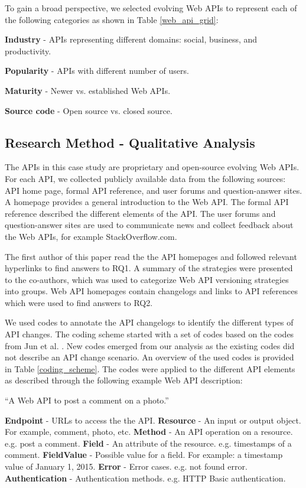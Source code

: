 \documentclass[conference]{IEEEtran}
\begin{document}
To gain a broad perspective, we selected evolving Web APIs to represent each of the following categories as shown in Table \ref{web_api_grid}:


\textbf{Industry} - APIs representing different domains: social, business, and productivity.

\textbf{Popularity} - APIs with different number of users.

\textbf{Maturity} - Newer vs. established Web APIs.

\textbf{Source code} - Open source vs. closed source.


\subsection{Research Method - Qualitative Analysis} %
\label{sub:research_method}

The APIs in this case study are proprietary and open-source evolving Web APIs. For each API, we collected publicly available data from the following sources: API home page, formal API reference, and user forums and question-answer sites. A homepage provides a general introduction to the Web API. The formal API reference described the different elements of the API. The user forums and question-answer sites are used to communicate news and collect feedback about the Web APIs, for example StackOverflow.com.

The first author of this paper read the the API homepages and followed relevant hyperlinks to find answers to RQ1. A summary of the strategies were presented to the co-authors, which was used to categorize Web API versioning strategies into groups. Web API homepages contain changelogs and links to API references which were used to find answers to RQ2.

We used codes to annotate the API changelogs to identify the different types of API changes. The coding scheme started with a set of codes based on the codes from Jun et al. \cite{li_client_2013}. New codes  emerged from our analysis as the existing codes did not describe an API change scenario. An overview of the used codes is provided in Table \ref{coding_scheme}. The codes were applied to the different API elements as described through the following example Web API description:

``A Web API to post a comment on a photo.''

\textbf{Endpoint} - URLs to access the the API.
\textbf{Resource} - An input or output object. For example, comment, photo, etc.
\textbf{Method} - An API operation on a resource. e.g. post a comment.
\textbf{Field} - An attribute of the resource. e.g. timestamps of a comment.
\textbf{FieldValue} - Possible value for a field. For example: a timestamp value of January 1, 2015.
\textbf{Error} - Error cases. e.g. not found error.
\textbf{Authentication} - Authentication methods. e.g. HTTP Basic authentication.
\end{document}
